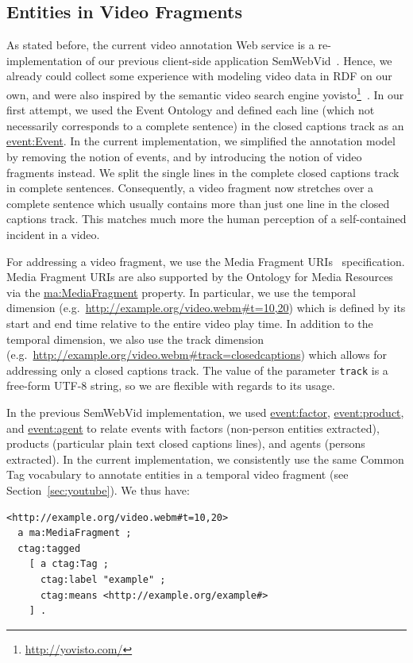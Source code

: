\documentclass[conference]{IEEEtran}
\newcommand{\nofootnote}[1]{~#1}
\begin{document}
\subsection{Entities in Video Fragments}
As stated before, the current video annotation Web service is a re-implementation of our previous client-side
application SemWebVid~\cite{Steiner:SemWebVid}. Hence, we already could collect some experience with modeling video
data in RDF on our own, and were also inspired by the semantic video search engine
yovisto\footnote{\url{http://yovisto.com/}}~\cite{Sack:Use,Sack:VideoSearch}. In our first attempt, we used the Event
Ontology\cite{Raimond:Event} and defined each line (which not necessarily corresponds to a complete sentence) in the
closed captions track as an \url{event:Event}. In the current implementation, we simplified the annotation model by
removing the notion of events, and by introducing the notion of video fragments instead. We split the single lines in
the complete closed captions track in complete sentences. Consequently, a video fragment now stretches over a complete
sentence which usually contains more than just one line in the closed captions track. This matches much more the human
perception of a self-contained incident in a video.

For addressing a video fragment, we use the Media Fragment URIs~\cite{W3C:MediaFrags} specification. Media Fragment
URIs are also supported by the Ontology for Media Resources via the \url{ma:MediaFragment} property. In particular, we
use the temporal dimension (e.g.\nofootnote{\url{http://example.org/video.webm#t=10,20}}) which is defined by its start
and end time relative to the entire video play time. In addition to the temporal dimension, we also use the track
dimension (e.g.\nofootnote{\url{http://example.org/video.webm#track=closedcaptions}}) which allows for addressing only
a closed captions track. The value of the parameter \texttt{track} is a free-form UTF-8 string, so we are flexible with
regards to its usage.

In the previous SemWebVid implementation, we used \url{event:factor}, \url{event:product}, and \url{event:agent} to
relate events with factors (non-person entities extracted), products (particular plain text closed captions lines), and
agents (persons extracted). In the current implementation, we consistently use the same Common Tag vocabulary to
annotate entities in a temporal video fragment (see Section~\ref{sec:youtube}). We thus have:
\begin{lstlisting}
<http://example.org/video.webm#t=10,20>
  a ma:MediaFragment ;
  ctag:tagged
    [ a ctag:Tag ;
      ctag:label "example" ;
      ctag:means <http://example.org/example#>
    ] .
\end{lstlisting}
\end{document}
